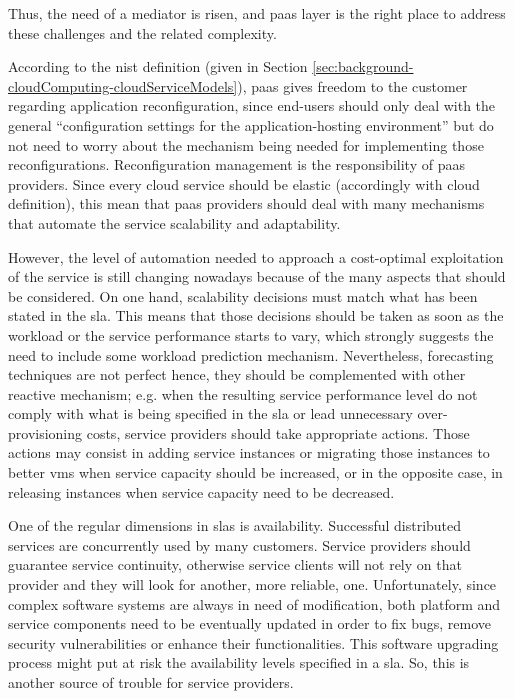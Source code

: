 Thus, the need of a mediator is risen, and \ac{paas} layer is the right place to address these challenges
and the related complexity.

According to the \ac{nist} definition (given in Section
\ref{sec:background-cloudComputing-cloudServiceModels}), \ac{paas} gives freedom to the customer regarding
application reconfiguration, since end-users should only deal with the general ``configuration settings
for the application-hosting environment'' but do not need to worry about the mechanism being needed
for implementing those reconfigurations. Reconfiguration management is the responsibility of \ac{paas}
providers. Since every cloud service should be elastic (accordingly with cloud definition), this mean
that \ac{paas} providers should deal with many mechanisms that automate the service scalability and
adaptability.

However, the level of automation needed to approach a cost-optimal exploitation of the service is still
changing nowadays because of the many aspects that should be considered. On one hand, scalability
decisions must match what has been stated in the \ac{sla}. This means that those decisions should be
taken as soon as the workload or the service performance starts to vary, which strongly suggests the
need to include some workload prediction mechanism. Nevertheless, forecasting techniques are not perfect
hence, they should be complemented with other reactive mechanism; e.g. when the resulting service
performance level do not comply with what is being specified in the \ac{sla} or lead unnecessary
over-provisioning costs, service providers should take appropriate actions. Those actions may consist
in adding service instances or migrating those instances to better \ac{vm}s when service capacity
should be increased, or in the opposite case, in releasing instances when service capacity need to be
decreased.

One of the regular dimensions in \ac{sla}s is availability. Successful distributed services are
concurrently used by many customers. Service providers should guarantee service continuity, otherwise
service clients will not rely on that provider and they will look for another, more reliable, one.
Unfortunately, since complex software systems are always in need of modification, both platform and
service components need to be eventually updated in order to fix bugs, remove security vulnerabilities
or enhance their functionalities. This software upgrading process might put at risk the availability levels
specified in a \ac{sla}. So, this is another source of trouble for service providers.

